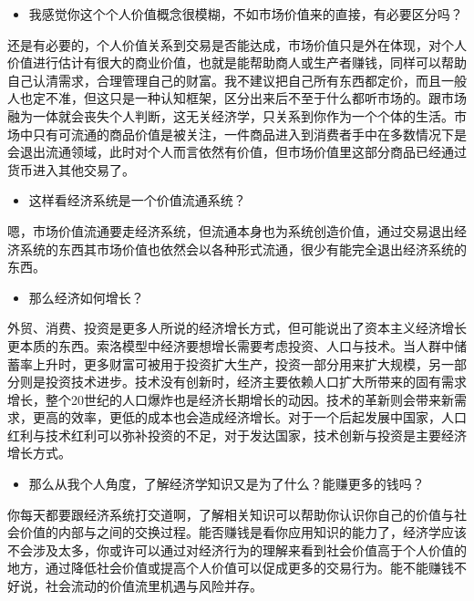 \documentclass[
  letterpaper,
  DIV=11,
  numbers=noendperiod]{scrreprt}
\providecommand{\tightlist}{%
  \setlength{\itemsep}{0pt}\setlength{\parskip}{0pt}}\usepackage{longtable,booktabs,array}
\begin{document}
\begin{itemize}
\tightlist
\item
  我感觉你这个个人价值概念很模糊，不如市场价值来的直接，有必要区分吗？
\end{itemize}

还是有必要的，个人价值关系到交易是否能达成，市场价值只是外在体现，对个人价值进行估计有很大的商业价值，也就是能帮助商人或生产者赚钱，同样可以帮助自己认清需求，合理管理自己的财富。我不建议把自己所有东西都定价，而且一般人也定不准，但这只是一种认知框架，区分出来后不至于什么都听市场的。跟市场融为一体就会丧失个人判断，这无关经济学，只关系到你作为一个个体的生活。市场中只有可流通的商品价值是被关注，一件商品进入到消费者手中在多数情况下是会退出流通领域，此时对个人而言依然有价值，但市场价值里这部分商品已经通过货币进入其他交易了。

\begin{itemize}
\tightlist
\item
  这样看经济系统是一个价值流通系统？
\end{itemize}

嗯，市场价值流通要走经济系统，但流通本身也为系统创造价值，通过交易退出经济系统的东西其市场价值也依然会以各种形式流通，很少有能完全退出经济系统的东西。

\begin{itemize}
\tightlist
\item
  那么经济如何增长？
\end{itemize}

外贸、消费、投资是更多人所说的经济增长方式，但可能说出了资本主义经济增长更本质的东西。索洛模型中经济要想增长需要考虑投资、人口与技术。当人群中储蓄率上升时，更多财富可被用于投资扩大生产，投资一部分用来扩大规模，另一部分则是投资技术进步。技术没有创新时，经济主要依赖人口扩大所带来的固有需求增长，整个20世纪的人口爆炸也是经济长期增长的动因。技术的革新则会带来新需求，更高的效率，更低的成本也会造成经济增长。对于一个后起发展中国家，人口红利与技术红利可以弥补投资的不足，对于发达国家，技术创新与投资是主要经济增长方式。

\begin{itemize}
\tightlist
\item
  那么从我个人角度，了解经济学知识又是为了什么？能赚更多的钱吗？
\end{itemize}

你每天都要跟经济系统打交道啊，了解相关知识可以帮助你认识你自己的价值与社会价值的内部与之间的交换过程。能否赚钱是看你应用知识的能力了，经济学应该不会涉及太多，你或许可以通过对经济行为的理解来看到社会价值高于个人价值的地方，通过降低社会价值或提高个人价值可以促成更多的交易行为。能不能赚钱不好说，社会流动的价值流里机遇与风险并存。
\end{document}
